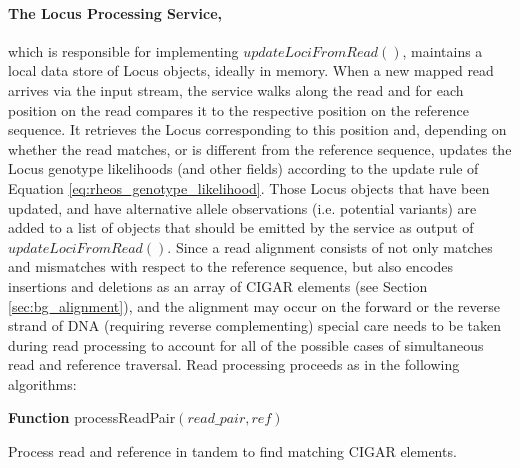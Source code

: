 \paragraph{The Locus Processing Service,} which is responsible for implementing $updateLociFromRead()$, maintains a local data store of Locus objects, ideally in memory. When a new mapped read arrives via the input stream, the service walks along the read and for each position on the read compares it to the respective position on the reference sequence. It retrieves the Locus corresponding to this position and, depending on whether the read matches, or is different from the reference sequence, updates the Locus genotype likelihoods (and other fields) according to the update rule of Equation \ref{eq:rheos_genotype_likelihood}. Those Locus objects that have been updated, and have alternative allele observations (i.e. potential variants) are added to a list of objects that should be emitted by the service as output of $updateLociFromRead()$. Since a read alignment consists of not only matches and mismatches with respect to the reference sequence, but also encodes insertions and deletions as an array of CIGAR elements (see Section \ref{sec:bg_alignment}), and the alignment may occur on the forward or the reverse strand of DNA (requiring reverse complementing) special care needs to be taken during read processing to account for all of the possible cases of simultaneous read and reference traversal. Read processing proceeds as in the following algorithms:

\begin{algorithm2e}[h]
    \DontPrintSemicolon
    \footnotesize
    \textbf{Function} {\sc processReadPair}$(read\_pair, ref)$
    \caption{Process read and reference in tandem to find matching CIGAR elements.}\label{ag:process_read_pair}
\end{algorithm2e}

